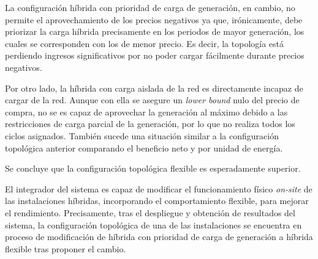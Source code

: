 La configuración híbrida con prioridad de carga de generación, en cambio, no permite el aprovechamiento de los precios negativos ya que, irónicamente, debe priorizar la carga híbrida precisamente en los periodos de mayor generación, los cuales se corresponden con los de menor precio. Es decir, la topología está perdiendo ingresos significativos por no poder cargar fácilmente durante precios negativos.

Por otro lado, la híbrida con carga aislada de la red es directamente incapaz de cargar de la red. Aunque con ella se asegure un \textit{lower bound} nulo del precio de compra, no se es capaz de aprovechar la generación al máximo debido a las restricciones de carga parcial de la generación, por lo que no realiza todos los ciclos asignados. También sucede una situación similar a la configuración topológica anterior comparando el beneficio neto y por unidad de energía.

\begin{table}[ht]
  \centering
  \caption[Comparación de configuraciones topológicas híbridas.]{Comparación de las métricas de las configuraciones topológicas híbridas.}%
  \label{tab:comparacion-hibridacion}
\end{table}

Se concluye que la configuración topológica flexible es esperadamente superior.

El integrador del sistema es capaz de modificar el funcionamiento físico \textit{on-site} de las instalaciones híbridas, incorporando el comportamiento flexible, para mejorar el rendimiento. Precisamente, tras el despliegue y obtención de resultados del sistema, la configuración topológica de una de las instalaciones se encuentra en proceso de modificación de híbrida con prioridad de carga de generación a híbrida flexible tras proponer el cambio.

